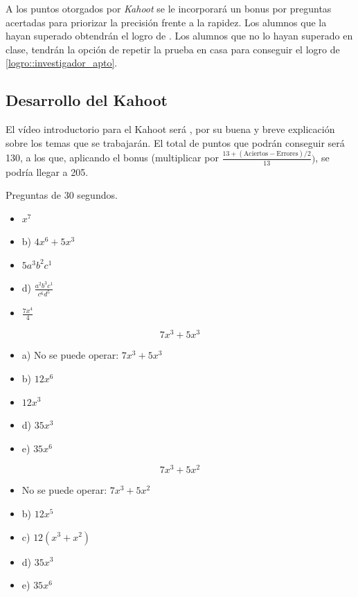 A los puntos otorgados por \textit{Kahoot} se le incorporará un bonus por preguntas acertadas para priorizar la precisión frente a la rapidez.
%
Los alumnos que la hayan superado obtendrán el logro de .
%
Los alumnos que no lo hayan superado en clase, tendrán la opción de repetir la prueba en casa para conseguir el logro de \ref{logro::investigador_apto}.


\subsection{Desarrollo del Kahoot}

El vídeo introductorio para el Kahoot será \cite{VideoKahootSes1}, por su buena y breve explicación sobre los temas que se trabajarán.
%
El total de puntos que podrán conseguir será 130, a los que, aplicando el bonus (multiplicar por  $\frac{13+(\text{Aciertos} - \text{Errores})/2}{13})$, se podría llegar a 205.

\newbloq Preguntas de 30 segundos.



\begin{itemize}
\item {} $x^7$
\item b) $4x^6+5x^3$
\item {} $5a^3b^2c^1$
\item d) $\frac{a^2b^3c^1}{c^6d^5}$
\item {} $\frac{7x^4}{4}$
\end{itemize}


\[
	7x^3+5x^3
\]

\begin{itemize}
	\item a) No se puede operar: $7x^3+5x^3$
	\item b) $12x^6$
	\item {} $12x^3$
	\item d) $35x^3$
	\item e) $35x^6$
\end{itemize}

\[
	7x^3+5x^2
\]

\begin{itemize}
	\item {}No se puede operar:  $7x^3+5x^2$
	\item b) $12x^5$
	\item c) $12(x^3+x^2)$
	\item d) $35x^3$
	\item e) $35x^6$
\end{itemize}

